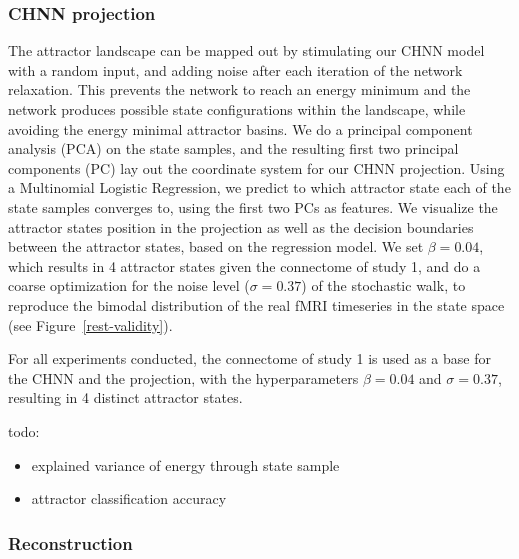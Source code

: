 \documentclass{article}
\begin{document}
\subsubsection{CHNN projection}\label{CHNN projection}

The attractor landscape can be mapped out by stimulating our CHNN model with a random input, and adding noise after
each iteration of the network relaxation. This prevents the network to reach an energy minimum and the network
produces possible state configurations within the landscape, while avoiding the energy minimal attractor basins.
We do a principal component analysis (PCA) on the state samples, and the resulting first two principal components (PC)
lay out the coordinate system for our CHNN projection. Using a Multinomial Logistic Regression, we predict to which
attractor state each of the state samples converges to, using the first two PCs as features. We visualize the attractor
states position in the projection as well as the decision boundaries between the attractor states, based on the
regression model. We set $\beta = 0.04$, which results in 4 attractor states given the connectome of study 1, and do a
coarse optimization for the noise level ($\sigma=0.37$) of the stochastic walk, to reproduce the bimodal distribution
of the real fMRI timeseries in the state space (see Figure~\ref{rest-validity}).

For all experiments conducted, the connectome of study 1 is used as a base for the CHNN and the projection, with the
hyperparameters $\beta = 0.04$ and $\sigma=0.37$, resulting in 4 distinct attractor states.

todo:

\begin{itemize}
\item explained variance of energy through state sample
\item attractor classification accuracy
\end{itemize}

\subsubsection{Reconstruction}\label{Reconstruction}
\end{document}
